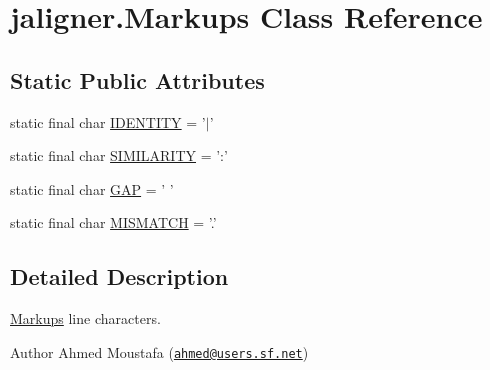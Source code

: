 \hypertarget{classjaligner_1_1_markups}{\section{jaligner.\+Markups Class Reference}
\label{classjaligner_1_1_markups}
}
\subsection*{Static Public Attributes}
\begin{DoxyCompactItemize}
\item 
static final char \hyperlink{classjaligner_1_1_markups_af32496371126c49532d828ba52839ca8}{I\+D\+E\+N\+T\+I\+T\+Y} = '$\vert$'
\item 
static final char \hyperlink{classjaligner_1_1_markups_a7efe6d3f877cee8e68e0dc5dd7ef92e8}{S\+I\+M\+I\+L\+A\+R\+I\+T\+Y} = '\+:'
\item 
static final char \hyperlink{classjaligner_1_1_markups_aeeccc407eb80259ed2fba80e03c03b98}{G\+A\+P} = ' '
\item 
static final char \hyperlink{classjaligner_1_1_markups_a21be83383bf355000556ba7c2a042a48}{M\+I\+S\+M\+A\+T\+C\+H} = '.'
\end{DoxyCompactItemize}


\subsection{Detailed Description}
\hyperlink{classjaligner_1_1_markups}{Markups} line characters.

\begin{DoxyAuthor}{Author}
Ahmed Moustafa (\href{mailto:ahmed@users.sf.net}{\tt ahmed@users.\+sf.\+net}) 
\end{DoxyAuthor}



